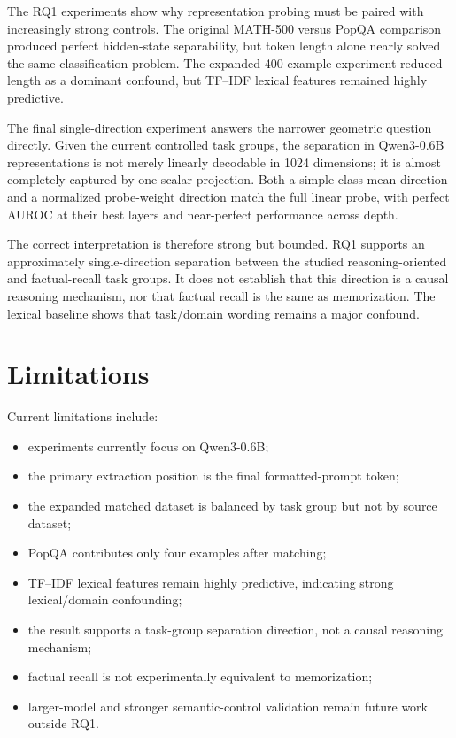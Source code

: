 \documentclass[11pt]{article}
\begin{document}
The RQ1 experiments show why representation probing must be paired with increasingly strong controls. The original MATH-500 versus PopQA comparison produced perfect hidden-state separability, but token length alone nearly solved the same classification problem. The expanded 400-example experiment reduced length as a dominant confound, but TF--IDF lexical features remained highly predictive.

The final single-direction experiment answers the narrower geometric question directly. Given the current controlled task groups, the separation in Qwen3-0.6B representations is not merely linearly decodable in 1024 dimensions; it is almost completely captured by one scalar projection. Both a simple class-mean direction and a normalized probe-weight direction match the full linear probe, with perfect AUROC at their best layers and near-perfect performance across depth.

The correct interpretation is therefore strong but bounded. RQ1 supports an approximately single-direction separation between the studied reasoning-oriented and factual-recall task groups. It does not establish that this direction is a causal reasoning mechanism, nor that factual recall is the same as memorization. The lexical baseline shows that task/domain wording remains a major confound.

\section{Limitations}

Current limitations include:

\begin{itemize}
    \item experiments currently focus on Qwen3-0.6B;
    \item the primary extraction position is the final formatted-prompt token;
    \item the expanded matched dataset is balanced by task group but not by source dataset;
    \item PopQA contributes only four examples after matching;
    \item TF--IDF lexical features remain highly predictive, indicating strong lexical/domain confounding;
    \item the result supports a task-group separation direction, not a causal reasoning mechanism;
    \item factual recall is not experimentally equivalent to memorization;
    \item larger-model and stronger semantic-control validation remain future work outside RQ1.
\end{itemize}
\end{document}
